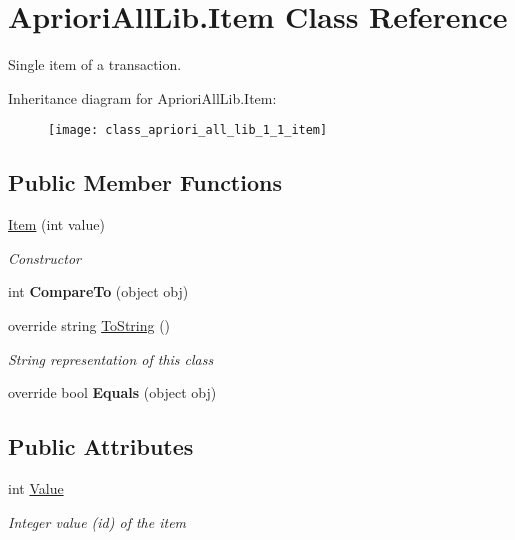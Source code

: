 \hypertarget{class_apriori_all_lib_1_1_item}{\section{Apriori\-All\-Lib.\-Item Class Reference}
\label{class_apriori_all_lib_1_1_item}
}


Single item of a transaction.  


Inheritance diagram for Apriori\-All\-Lib.\-Item\-:\begin{figure}[H]
\begin{center}
\leavevmode
\texttt{[image: class\_apriori\_all\_lib\_1\_1\_item]}
\end{center}
\end{figure}
\subsection*{Public Member Functions}
\begin{DoxyCompactItemize}
\item 
\hyperlink{class_apriori_all_lib_1_1_item_aed218e4e6b27b6ac780be54f6f483d59}{Item} (int value)
\begin{DoxyCompactList}\small\item\em Constructor \end{DoxyCompactList}\item 
\hypertarget{class_apriori_all_lib_1_1_item_a0b0e9bbfeea95abed90935db84beb999}{int {\bfseries Compare\-To} (object obj)}\label{class_apriori_all_lib_1_1_item_a0b0e9bbfeea95abed90935db84beb999}

\item 
override string \hyperlink{class_apriori_all_lib_1_1_item_a020b36119d00b63670da5688967dc147}{To\-String} ()
\begin{DoxyCompactList}\small\item\em String representation of this class \end{DoxyCompactList}\item 
\hypertarget{class_apriori_all_lib_1_1_item_a69489ac60415029faf0dc3e7dc926e62}{override bool {\bfseries Equals} (object obj)}\label{class_apriori_all_lib_1_1_item_a69489ac60415029faf0dc3e7dc926e62}

\end{DoxyCompactItemize}
\subsection*{Public Attributes}
\begin{DoxyCompactItemize}
\item 
int \hyperlink{class_apriori_all_lib_1_1_item_ab54b4b9529a99f74048264c3ed2ab6bd}{Value}
\begin{DoxyCompactList}\small\item\em Integer value (id) of the item \end{DoxyCompactList}\end{DoxyCompactItemize}


